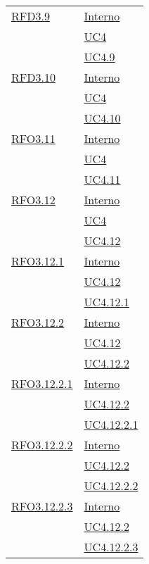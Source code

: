 \begin{longtable}{|>{\centering}m{5cm}|m{5cm}<{\centering}|}
\hyperlink{RFD3.9}{RFD3.9} &  \hyperlink{Interno}{Interno}\\ &\hyperref[UC4]{UC4}\\ &\hyperref[UC4.9]{UC4.9}\\ \hline

\hyperlink{RFD3.10}{RFD3.10} &   \hyperlink{Interno}{Interno}\\ &\hyperref[UC4]{UC4}\\ &\hyperref[UC4.10]{UC4.10}\\ \hline

\hyperlink{RFO3.11}{RFO3.11} &  \hyperlink{Interno}{Interno}\\ &\hyperref[UC4]{UC4}\\ &\hyperref[UC4.11]{UC4.11}\\ \hline

\hyperlink{RFO3.12}{RFO3.12} &  \hyperlink{Interno}{Interno}\\ &\hyperref[UC4]{UC4}\\ &\hyperref[UC4.12]{UC4.12}\\ \hline

\hyperlink{RFO3.12.1}{RFO3.12.1} & \hyperlink{Interno}{Interno}\\ &\hyperref[UC4.12]{UC4.12}\\ &\hyperref[UC4.12.1]{UC4.12.1}\\ \hline

\hyperlink{RFO3.12.2}{RFO3.12.2} & \hyperlink{Interno}{Interno}\\ &\hyperref[UC4.12]{UC4.12}\\ &\hyperref[UC4.12.2]{UC4.12.2}\\ \hline

\hyperlink{RFO3.12.2.1}{RFO3.12.2.1} & \hyperlink{Interno}{Interno}\\ &\hyperref[UC4.12.2]{UC4.12.2}\\ &\hyperref[UC4.12.2.1]{UC4.12.2.1}\\ \hline

\hyperlink{RFO3.12.2.2}{RFO3.12.2.2} &  \hyperlink{Interno}{Interno}\\ &\hyperref[UC4.12.2]{UC4.12.2}\\ &\hyperref[UC4.12.2.2]{UC4.12.2.2}\\ \hline

\hyperlink{RFO3.12.2.3}{RFO3.12.2.3} & \hyperlink{Interno}{Interno}\\ &\hyperref[UC4.12.2]{UC4.12.2}\\ &\hyperref[UC4.12.2.3]{UC4.12.2.3}\\ \hline


\end{longtable}
